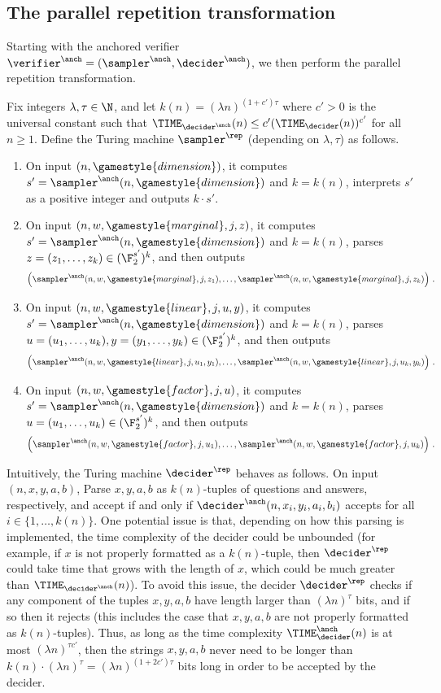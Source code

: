 \subsection{The parallel repetition transformation} 
\label{sec:anchored-repetition}
Starting with the anchored verifier $\vanch = (\sanch,\danch)$, we 
then perform the parallel repetition transformation.

Fix integers $\lambda, \tau \in \N$, and let $k(n) = (\lambda n)^{(1 + c')\tau}$ where $c' >0$ is the universal constant such that $\TIME_{\danch}(n) \leq c'(\TIME_\decider(n))^{c'}$ for all $n \geq 1$. Define the Turing machine $\sampler^\rep$ (depending on $\lambda,\tau$) as follows. 
\begin{enumerate}
	\item On input $(n,\gamestyle{dimension})$, it computes $s' = \sanch(n,\gamestyle{dimension})$ and $k = k(n)$, interprets $s'$ as a positive integer and outputs $k \cdot s'$. 
	\item On input $(n,w,\gamestyle{marginal},j,z)$, it computes $s' = \sanch(n,\gamestyle{dimension})$ and $k = k(n)$, parses $z = (z_1,\ldots,z_k) \in (\F_2^{s'})^k$, and then outputs
	\[
		\Big ( \sanch(n,w,\gamestyle{marginal},j,z_1), \ldots, \sanch(n,w,\gamestyle{marginal},j,z_k)\Big)~.
	\]
	\item On input $(n,w,\gamestyle{linear},j,u,y)$, it computes $s' = \sanch(n,\gamestyle{dimension})$ and $k = k(n)$, parses $u = (u_1,\ldots,u_k), y = (y_1,\ldots,y_k) \in (\F_2^{s'})^k$, and then outputs
	\[
		\Big ( \sanch(n,w,\gamestyle{linear},j,u_1,y_1), \ldots, \sanch(n,w,\gamestyle{linear},j,u_k,y_k)\Big)~.
	\]
	\item On input $(n,w,\gamestyle{factor},j,u)$, it computes $s' = \sanch(n,\gamestyle{dimension})$ and $k = k(n)$, parses $u = (u_1,\ldots,u_k) \in (\F_2^{s'})^k$, and then outputs
	\[
		\Big ( \sanch(n,w,\gamestyle{factor},j,u_1), \ldots, \sanch(n,w,\gamestyle{factor},j,u_k)\Big)~.
	\]
\end{enumerate}
Intuitively, the Turing machine $\decider^\rep$ behaves as follows. On input
$(n,{x},{y},{a},{b})$, Parse $x,y,a,b$ as $k(n)$-tuples of questions and answers, respectively, and accept if and only if $\danch(n,x_i,y_i,a_i,b_i)$
accepts for all $i \in \{ 1,\ldots,k(n) \}$. One potential issue is that, depending on how this parsing is implemented, the time complexity of the decider could be unbounded (for example, if $x$ is not properly formatted as a $k(n)$-tuple, then $\decider^\rep$ could take time that grows with the length of $x$, which could be much greater than $\TIME_{\danch}(n)$). To avoid this issue, the decider $\decider^\rep$ checks if any component of the tuples $x,y,a,b$ have length larger than $(\lambda n)^\tau$ bits, and if so then it rejects (this includes the case that $x,y,a,b$ are not properly formatted as $k(n)$-tuples). 
Thus, as long as the time complexity $\TIME_\danch(n)$ is at most $(\lambda n)^{\tau c'}$, then the strings $x,y,a,b$ never need to be longer than $k(n) \cdot (\lambda n)^\tau = (\lambda n)^{(1 + 2c')\tau}$ bits long in order to be accepted by the decider.

